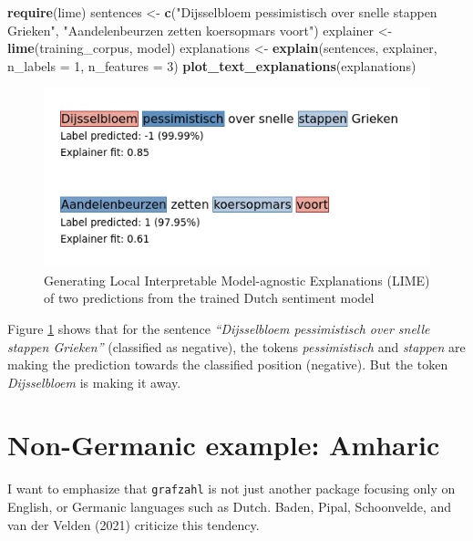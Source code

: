 \documentclass[
  english,
  man,floatsintext]{apa6}
\newenvironment{Shaded}{\begin{snugshade}}{\end{snugshade}}
\newcommand{\DataTypeTok}[1]{\textcolor[rgb]{0.13,0.29,0.53}{#1}}
\newcommand{\DecValTok}[1]{\textcolor[rgb]{0.00,0.00,0.81}{#1}}
\newcommand{\KeywordTok}[1]{\textcolor[rgb]{0.13,0.29,0.53}{\textbf{#1}}}
\newcommand{\NormalTok}[1]{#1}
\newcommand{\StringTok}[1]{\textcolor[rgb]{0.31,0.60,0.02}{#1}}
\begin{document}
\begin{Shaded}
\begin{Highlighting}[]
\KeywordTok{require}\NormalTok{(lime)}
\NormalTok{sentences \textless{}{-}}\StringTok{ }\KeywordTok{c}\NormalTok{(}\StringTok{"Dijsselbloem pessimistisch over snelle stappen Grieken"}\NormalTok{,}
               \StringTok{"Aandelenbeurzen zetten koersopmars voort"}\NormalTok{)}
\NormalTok{explainer \textless{}{-}}\StringTok{ }\KeywordTok{lime}\NormalTok{(training\_corpus, model)}
\NormalTok{explanations \textless{}{-}}\StringTok{ }\KeywordTok{explain}\NormalTok{(sentences, explainer, }\DataTypeTok{n\_labels =} \DecValTok{1}\NormalTok{,}
                        \DataTypeTok{n\_features =} \DecValTok{3}\NormalTok{)}
\KeywordTok{plot\_text\_explanations}\NormalTok{(explanations)}
\end{Highlighting}
\end{Shaded}

\begin{figure}
\includegraphics[width=1\linewidth]{fig1} \caption{Generating Local Interpretable Model-agnostic Explanations (LIME) of two predictions from the trained Dutch sentiment model}\label{fig:fig1}
\end{figure}

Figure \ref{fig:fig1} shows that for the sentence \emph{``Dijsselbloem pessimistisch over snelle stappen Grieken''} (classified as negative), the tokens \emph{pessimistisch} and \emph{stappen} are making the prediction towards the classified position (negative). But the token \emph{Dijsselbloem} is making it away.

\hypertarget{non-germanic-example-amharic}{%
\section{Non-Germanic example: Amharic}\label{non-germanic-example-amharic}}

I want to emphasize that \texttt{grafzahl} is not just another package focusing only on English, or Germanic languages such as Dutch. Baden, Pipal, Schoonvelde, and van der Velden (2021) criticize this tendency.
\end{document}
